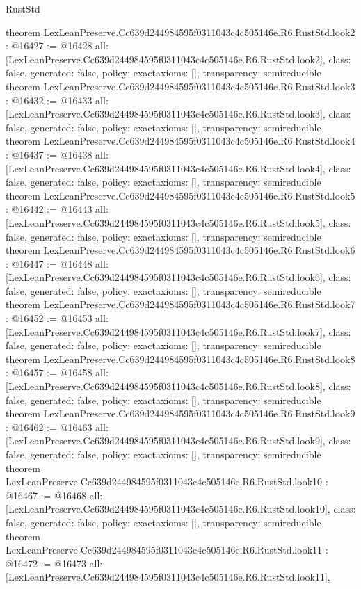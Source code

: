 \begin{lexlean}{RustStd}
\begin{coremodule}
{}
theorem LexLeanPreserve.Cc639d244984595f0311043c4c505146e.R6.RustStd.look2 : @16427 := @16428 {
  all: [LexLeanPreserve.Cc639d244984595f0311043c4c505146e.R6.RustStd.look2],
  class: false,
  generated: false,
  policy: exact{axioms: []},
  transparency: semireducible
}
theorem LexLeanPreserve.Cc639d244984595f0311043c4c505146e.R6.RustStd.look3 : @16432 := @16433 {
  all: [LexLeanPreserve.Cc639d244984595f0311043c4c505146e.R6.RustStd.look3],
  class: false,
  generated: false,
  policy: exact{axioms: []},
  transparency: semireducible
}
theorem LexLeanPreserve.Cc639d244984595f0311043c4c505146e.R6.RustStd.look4 : @16437 := @16438 {
  all: [LexLeanPreserve.Cc639d244984595f0311043c4c505146e.R6.RustStd.look4],
  class: false,
  generated: false,
  policy: exact{axioms: []},
  transparency: semireducible
}
theorem LexLeanPreserve.Cc639d244984595f0311043c4c505146e.R6.RustStd.look5 : @16442 := @16443 {
  all: [LexLeanPreserve.Cc639d244984595f0311043c4c505146e.R6.RustStd.look5],
  class: false,
  generated: false,
  policy: exact{axioms: []},
  transparency: semireducible
}
theorem LexLeanPreserve.Cc639d244984595f0311043c4c505146e.R6.RustStd.look6 : @16447 := @16448 {
  all: [LexLeanPreserve.Cc639d244984595f0311043c4c505146e.R6.RustStd.look6],
  class: false,
  generated: false,
  policy: exact{axioms: []},
  transparency: semireducible
}
theorem LexLeanPreserve.Cc639d244984595f0311043c4c505146e.R6.RustStd.look7 : @16452 := @16453 {
  all: [LexLeanPreserve.Cc639d244984595f0311043c4c505146e.R6.RustStd.look7],
  class: false,
  generated: false,
  policy: exact{axioms: []},
  transparency: semireducible
}
theorem LexLeanPreserve.Cc639d244984595f0311043c4c505146e.R6.RustStd.look8 : @16457 := @16458 {
  all: [LexLeanPreserve.Cc639d244984595f0311043c4c505146e.R6.RustStd.look8],
  class: false,
  generated: false,
  policy: exact{axioms: []},
  transparency: semireducible
}
theorem LexLeanPreserve.Cc639d244984595f0311043c4c505146e.R6.RustStd.look9 : @16462 := @16463 {
  all: [LexLeanPreserve.Cc639d244984595f0311043c4c505146e.R6.RustStd.look9],
  class: false,
  generated: false,
  policy: exact{axioms: []},
  transparency: semireducible
}
theorem LexLeanPreserve.Cc639d244984595f0311043c4c505146e.R6.RustStd.look10 : @16467 := @16468 {
  all: [LexLeanPreserve.Cc639d244984595f0311043c4c505146e.R6.RustStd.look10],
  class: false,
  generated: false,
  policy: exact{axioms: []},
  transparency: semireducible
}
theorem LexLeanPreserve.Cc639d244984595f0311043c4c505146e.R6.RustStd.look11 : @16472 := @16473 {
  all: [LexLeanPreserve.Cc639d244984595f0311043c4c505146e.R6.RustStd.look11],
}
\end{coremodule}
\end{lexlean}
